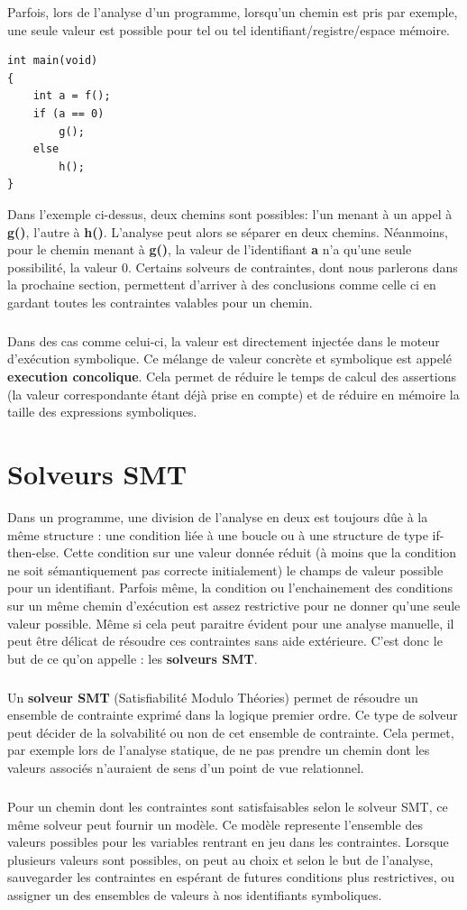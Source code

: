Parfois, lors de l'analyse d'un programme, lorsqu'un chemin est pris par exemple, une seule valeur est possible pour tel ou tel identifiant/registre/espace mémoire.
\begin {lstlisting}[frame=single]
int main(void)
{
    int a = f();
    if (a == 0)
        g();
    else
        h();
}
\end{lstlisting}
Dans l'exemple ci-dessus, deux chemins sont possibles: l'un menant à un appel à \textbf{g()}, l'autre à \textbf{h()}.
L'analyse peut alors se séparer en deux chemins. Néanmoins, pour le chemin menant à \textbf{g()}, la valeur de l'identifiant \textbf{a}
n'a qu'une seule possibilité, la valeur 0. Certains solveurs de contraintes, dont nous parlerons dans la prochaine section, permettent d'arriver
à des conclusions comme celle ci en gardant toutes les contraintes valables pour un chemin.
\subparagraph{}
Dans des cas comme celui-ci, la valeur est directement injectée dans le moteur d'exécution symbolique. Ce mélange de valeur concrète et symbolique est
appelé \textbf{execution concolique}. Cela permet de réduire le temps de calcul des assertions (la valeur correspondante étant déjà prise en compte) et de
réduire en mémoire la taille des expressions symboliques.


\section{Solveurs SMT}
Dans un programme, une division de l'analyse en deux est toujours dûe à la même structure : une condition liée à une boucle ou à une structure de type if-then-else.
Cette condition sur une valeur donnée réduit (à moins que la condition ne soit sémantiquement pas correcte initialement) le champs de valeur possible pour un identifiant.
Parfois même, la condition ou l'enchainement des conditions sur un même chemin d'exécution est assez restrictive pour ne donner qu'une seule valeur possible.
Même si cela peut paraitre évident pour une analyse manuelle, il peut être délicat de résoudre ces contraintes sans aide extérieure. C'est donc le but de ce qu'on appelle : les \textbf{solveurs SMT}.
\subparagraph{}
Un \textbf{solveur SMT} (Satisfiabilité Modulo Théories) permet de résoudre un ensemble de contrainte exprimé dans la logique premier ordre. Ce type de solveur peut décider
de la solvabilité ou non de cet ensemble de contrainte. Cela permet, par exemple lors de l'analyse statique, de ne pas prendre un chemin dont les valeurs associés n'auraient
de sens d'un point de vue relationnel.
\subparagraph{}
Pour un chemin dont les contraintes sont satisfaisables selon le solveur SMT, ce même solveur peut fournir un modèle. Ce modèle represente l'ensemble des valeurs possibles
pour les variables rentrant en jeu dans les contraintes. Lorsque plusieurs valeurs sont possibles, on peut au choix et selon le but de l'analyse, sauvegarder les contraintes
en espérant de futures conditions plus restrictives, ou assigner un des ensembles de valeurs à nos identifiants symboliques.



